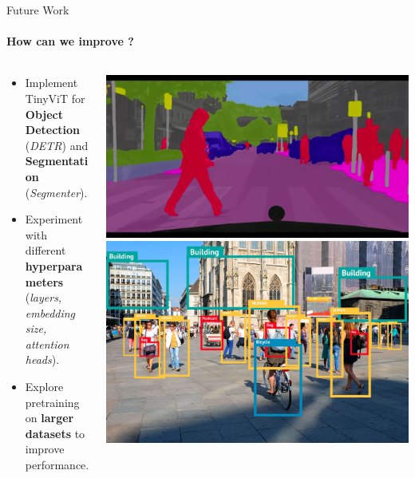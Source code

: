\begin{frame}[fragile]{Future Work}
  \framesubtitle{How can we improve ?}
  \begin{columns}
    \begin{column}{0.7\textwidth}
      \begin{itemize}
        \item Implement TinyViT for \textbf{Object Detection} (\textit{DETR}) and \textbf{Segmentation} (\textit{Segmenter}).
        \item Experiment with different \textbf{hyperparameters} (\textit{layers, embedding size, attention heads}).
        \item Explore pretraining on \textbf{larger datasets} to improve performance.
      \end{itemize}
    \end{column}
    \begin{column}{0.3\textwidth}
      \includegraphics[width=\textwidth]{images/segmentation.png}
      \includegraphics[width=\textwidth]{images/objectdetection.jpg}
    \end{column}
  \end{columns}
\end{frame}